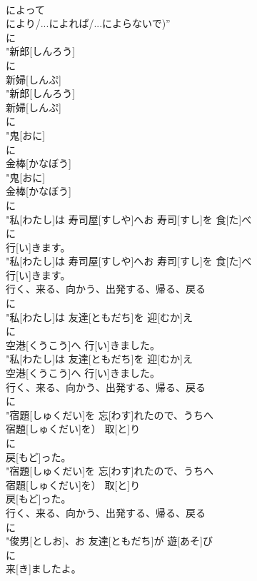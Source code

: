 \documentclass[8pt]{extreport}
\begin{document}
\begin{CJK}{UTF8}{min}
\\	によって 
\\	により/...によれば/...によらないで)”	
\\	に
\\	"新郎[しんろう]
\\	に
\\	新婦[しんぷ]
\\	"新郎[しんろう]
\\	新婦[しんぷ]
\\	に
\\	"鬼[おに]
\\	に
\\	金棒[かなぼう]
\\	"鬼[おに]
\\	金棒[かなぼう]
\\	に
\\	"私[わたし]は 寿司屋[すしや]へお 寿司[すし]を 食[た]べ
\\	に
\\	行[い]きます。
\\	"私[わたし]は 寿司屋[すしや]へお 寿司[すし]を 食[た]べ
\\	行[い]きます。
\\	行く、来る、向かう、出発する、帰る、戻る	
\\	に
\\	"私[わたし]は 友達[ともだち]を 迎[むか]え
\\	に
\\	空港[くうこう]へ 行[い]きました。
\\	"私[わたし]は 友達[ともだち]を 迎[むか]え
\\	空港[くうこう]へ 行[い]きました。
\\	行く、来る、向かう、出発する、帰る、戻る	
\\	に
\\	"宿題[しゅくだい]を 忘[わす]れたので、うちへ
\\	宿題[しゅくだい]を） 取[と]り
\\	に
\\	戻[もど]った。
\\	"宿題[しゅくだい]を 忘[わす]れたので、うちへ
\\	宿題[しゅくだい]を） 取[と]り
\\	戻[もど]った。
\\	行く、来る、向かう、出発する、帰る、戻る	
\\	に
\\	"俊男[としお]、お 友達[ともだち]が 遊[あそ]び
\\	に
\\	来[き]ましたよ。

\end{CJK}
\end{document}
